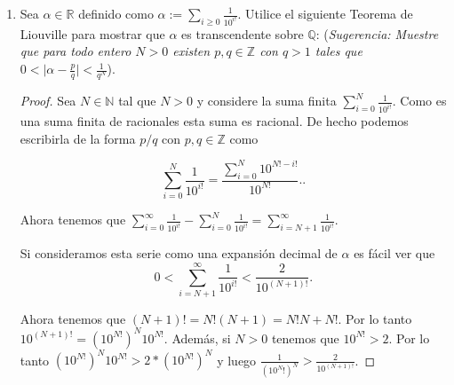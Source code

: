 \documentclass[letter,twoside,12pt]{article}
\begin{document}
\begin{enumerate}
\begin{proof}
Entonces como $ p(x) $ es irreducible esto implica que al tomar el g.c.d con $ p'(x) $ que es un grado menor y por lo tanto diferente de $ p(x) $ concluimos que el g.c.d. es igual 1, porque de lo contrario el g.c.d sería un factor de grado >0 y diferente de $ p(x) $ que divide a $ p(x) $ y por lo tanto $ p(x) $ no sería irreducible.

Ahora para el caso en que el campo es de característica $ p $ tenemos que si el campo $ K $ es finito entonces cualquier extensión $ L $ finita tiene un número finito de elementos. Pero en una tarea anterior demostramos que si $ L $ es finito entonces su cardinalidad es igual a $ p^n $ para algún $ n \in \mathbb{N} $. Pero entonces por el punto anterior $ L $ sería el cuerpo de descomposición del polinomio $ x^{p^n}-x $. Concluimos entonces que es separable.
\end{proof}

\item Sea $ \alpha \in \mathbb{R} $ definido como $ \alpha := \displaystyle\sum_{i \geq 0}\frac{1}{10^{i!}} $. Utilice el siguiente Teorema de Liouville para mostrar que $ \alpha $ es
transcendente sobre $ \mathbb{Q} $: (\textit{Sugerencia: Muestre que para todo entero $ N > 0 $ existen $ p, q \in \mathbb{Z} $ con $ q > 1 $ tales
que $\displaystyle  0 < \Big|\alpha - \frac{p}{q}\Big|<\frac{1}{q^N}$}).

\begin{proof}
Sea $ N \in \mathbb{N} $ tal que $ N>0 $ y considere la suma finita $ \displaystyle \sum_{i=0}^N \frac{1}{10^{i!}} $. Como es una suma finita de racionales esta suma es racional. De hecho podemos escribirla de la forma $ p/q $ con $ p,q \in \mathbb{Z} $ como

\begin{equation}
\sum_{i=0}^N \frac{1}{10^{i!}} = \frac{\sum_{i=0}^N 10^{N!-i!}} {10^{N!}}. \nonumber.
\end{equation}

Ahora tenemos que $ \displaystyle \sum_{i=0}^\infty \frac{1}{10^{i!}}-\sum_{i=0}^N \frac{1}{10^{i!}}=\sum_{i=N+1}^\infty \frac{1}{10^{i!}} $.

Si consideramos esta serie como una expansión decimal de $ \alpha $ es fácil ver que 
\begin{equation}
0< \sum_{i=N+1}^\infty \nonumber\frac{1}{10^{i!}} < \frac{2}{10^{(N+1)!}}.
\end{equation}

Ahora tenemos que $ (N+1)!=N!(N+1)=N!N+N! $. Por lo tanto $ 10^{(N+1)!}=(10^{N!})^N10^{N!} $. Además, si $ N > 0 $ tenemos que $ 10^{N!}>2 $. Por lo tanto $ (10^{N!})^N10^{N!}>2*(10^{N!})^N $ y luego $ \displaystyle \frac{1}{(10^N!)^N}>\frac{2}{10^{(N+1)!}} $.


\end{proof}
\end{enumerate}
\end{document}
